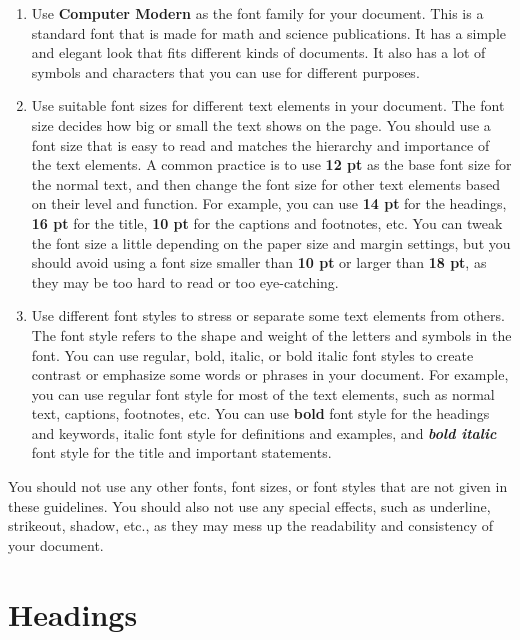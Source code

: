 \documentclass[12pt]{article}
\begin{document}
\begin{enumerate}
    \item Use \textbf{Computer Modern} as the font family for your document. This is a standard font that is made for math and science publications. It has a simple and elegant look that fits different kinds of documents. It also has a lot of symbols and characters that you can use for different purposes.
    \item Use suitable font sizes for different text elements in your document. The font size decides how big or small the text shows on the page. You should use a font size that is easy to read and matches the hierarchy and importance of the text elements. A common practice is to use \textbf{12 pt} as the base font size for the normal text, and then change the font size for other text elements based on their level and function. For example, you can use \textbf{14 pt} for the headings, \textbf{16 pt} for the title, \textbf{10 pt} for the captions and footnotes, etc. You can tweak the font size a little depending on the paper size and margin settings, but you should avoid using a font size smaller than \textbf{10 pt} or larger than \textbf{18 pt}, as they may be too hard to read or too eye-catching.
    \item Use different font styles to stress or separate some text elements from others. The font style refers to the shape and weight of the letters and symbols in the font. You can use regular, bold, italic, or bold italic font styles to create contrast or emphasize some words or phrases in your document. For example, you can use regular font style for most of the text elements, such as normal text, captions, footnotes, etc. You can use \textbf{bold} font style for the headings and keywords, italic font style for definitions and examples, and \textbf{\textit{bold italic}} font style for the title and important statements.
\end{enumerate}

You should not use any other fonts, font sizes, or font styles that are not given in these guidelines. You should also not use any special effects, such as underline, strikeout, shadow, etc., as they may mess up the readability and consistency of your document.

\pagebreak

\section{Headings}
\end{document}
